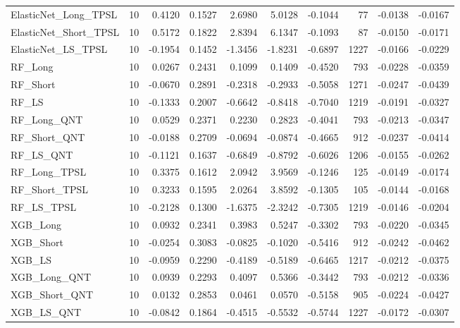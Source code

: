 \begin{tabular}{llrrrrrrrr}
\cline{1-10}
ElasticNet\_Long\_TPSL & 10 & 0.4120 & 0.1527 & 2.6980 & 5.0128 & -0.1044 & 77 & -0.0138 & -0.0167 \\
\cline{1-10}
ElasticNet\_Short\_TPSL & 10 & 0.5172 & 0.1822 & 2.8394 & 6.1347 & -0.1093 & 87 & -0.0150 & -0.0171 \\
\cline{1-10}
ElasticNet\_LS\_TPSL & 10 & -0.1954 & 0.1452 & -1.3456 & -1.8231 & -0.6897 & 1227 & -0.0166 & -0.0229 \\
\cline{1-10}
RF\_Long & 10 & 0.0267 & 0.2431 & 0.1099 & 0.1409 & -0.4520 & 793 & -0.0228 & -0.0359 \\
\cline{1-10}
RF\_Short & 10 & -0.0670 & 0.2891 & -0.2318 & -0.2933 & -0.5058 & 1271 & -0.0247 & -0.0439 \\
\cline{1-10}
RF\_LS & 10 & -0.1333 & 0.2007 & -0.6642 & -0.8418 & -0.7040 & 1219 & -0.0191 & -0.0327 \\
\cline{1-10}
RF\_Long\_QNT & 10 & 0.0529 & 0.2371 & 0.2230 & 0.2823 & -0.4041 & 793 & -0.0213 & -0.0347 \\
\cline{1-10}
RF\_Short\_QNT & 10 & -0.0188 & 0.2709 & -0.0694 & -0.0874 & -0.4665 & 912 & -0.0237 & -0.0414 \\
\cline{1-10}
RF\_LS\_QNT & 10 & -0.1121 & 0.1637 & -0.6849 & -0.8792 & -0.6026 & 1206 & -0.0155 & -0.0262 \\
\cline{1-10}
RF\_Long\_TPSL & 10 & 0.3375 & 0.1612 & 2.0942 & 3.9569 & -0.1246 & 125 & -0.0149 & -0.0174 \\
\cline{1-10}
RF\_Short\_TPSL & 10 & 0.3233 & 0.1595 & 2.0264 & 3.8592 & -0.1305 & 105 & -0.0144 & -0.0168 \\
\cline{1-10}
RF\_LS\_TPSL & 10 & -0.2128 & 0.1300 & -1.6375 & -2.3242 & -0.7305 & 1219 & -0.0146 & -0.0204 \\
\cline{1-10}
XGB\_Long & 10 & 0.0932 & 0.2341 & 0.3983 & 0.5247 & -0.3302 & 793 & -0.0220 & -0.0345 \\
\cline{1-10}
XGB\_Short & 10 & -0.0254 & 0.3083 & -0.0825 & -0.1020 & -0.5416 & 912 & -0.0242 & -0.0462 \\
\cline{1-10}
XGB\_LS & 10 & -0.0959 & 0.2290 & -0.4189 & -0.5189 & -0.6465 & 1217 & -0.0212 & -0.0375 \\
\cline{1-10}
XGB\_Long\_QNT & 10 & 0.0939 & 0.2293 & 0.4097 & 0.5366 & -0.3442 & 793 & -0.0212 & -0.0336 \\
\cline{1-10}
XGB\_Short\_QNT & 10 & 0.0132 & 0.2853 & 0.0461 & 0.0570 & -0.5158 & 905 & -0.0224 & -0.0427 \\
\cline{1-10}
XGB\_LS\_QNT & 10 & -0.0842 & 0.1864 & -0.4515 & -0.5532 & -0.5744 & 1227 & -0.0172 & -0.0307 \\

\end{tabular}
